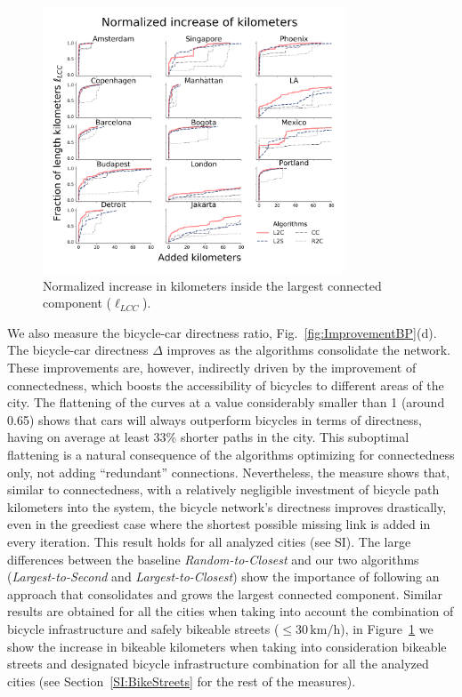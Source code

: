 \begin{figure}[ht!]
  \centering
  \includegraphics[width=0.8\textwidth]{images/datadriven/SI_Lengths_Bike_Streets.png}
  \caption{Normalized increase in kilometers inside the largest connected component ($\ell_{LCC}$).}
  \label{fig:Lengthsncrease_BikeStreets}
\end{figure}

We also measure the bicycle-car directness ratio, Fig.~\ref{fig:ImprovementBP}(d). The bicycle-car directness $\Delta$ improves as the algorithms consolidate the network. These improvements are, however, indirectly driven by the improvement of connectedness, which boosts the accessibility of bicycles to different areas of the city. The flattening of the curves at a value considerably smaller than 1 (around 0.65) shows that cars will always outperform bicycles in terms of directness, having on average at least 33\% shorter paths in the city. This suboptimal flattening is a natural consequence of the algorithms optimizing for connectedness only, not adding ``redundant'' connections. Nevertheless, the measure shows that, similar to connectedness, with a relatively negligible investment of bicycle path kilometers into the system, the bicycle network's directness improves drastically, even in the greediest case where the shortest possible missing link is added in every iteration. This result holds for all analyzed cities (see SI). The large differences between the baseline \emph{Random-to-Closest} and our two algorithms (\emph{Largest-to-Second} and \emph{Largest-to-Closest}) show the importance of following an approach that consolidates and grows the largest connected component. Similar results are obtained for all the cities when taking into account the combination of bicycle infrastructure and safely bikeable streets ($\leq 30\,\mathrm{km/h}$), in Figure~\ref{fig:Lengthsncrease_BikeStreets} we show the increase in bikeable kilometers when taking into consideration bikeable streets and designated bicycle infrastructure combination for all the analyzed cities (see Section~\ref{SI:BikeStreets} for the rest of the measures).

